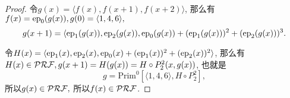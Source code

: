 
\hspace*{\fill}

\begin{proof}
    令$g(x)=\langle f(x),f(x+1),f(x+2)\rangle$, 那么有$f(x)=\mathrm{ep}_0(g(x)),g(0)=\langle 1,4,6\rangle,$
    $$g(x+1)=\langle \mathrm{ep}_1(g(x)), \mathrm{ep}_2(g(x)), \mathrm{ep}_0(g(x))+(\mathrm{ep}_1(g(x)))^2+(\mathrm{ep}_2(g(x)))^3.$$

    令$H(x)=\langle \mathrm{ep}_1(x), \mathrm{ep}_2(x), \mathrm{ep}_0(x)+(\mathrm{ep}_1(x))^2+(\mathrm{ep}_2(x))^2\rangle$, 那么有
    $H(x)\in\mathcal{PRF},g(x+1)=H(g(x))=H\circ P_2^2(x, g(x))$, 也就是$$g=\mathrm{Prim}^0[\langle 1,4,6\rangle, H\circ P_2^2],$$
    所以$g(x)\in\mathcal{PRF},$ 所以$f(x)\in\mathcal{PRF}$.
\end{proof}